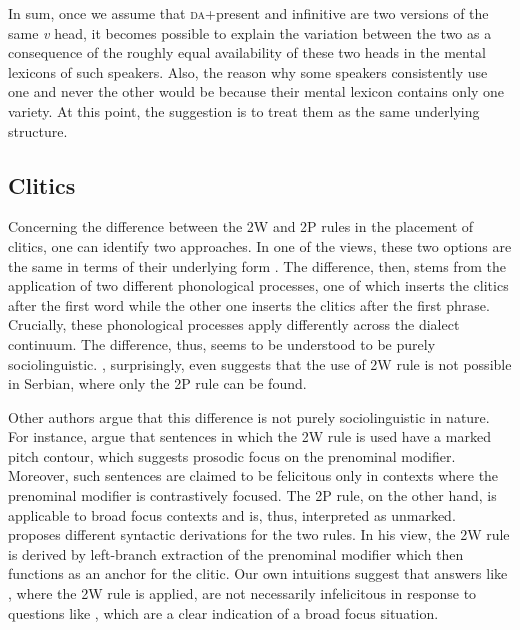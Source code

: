\documentclass[output=paper,modfonts,newtxmath,hidelinks,]{langscibook}
\begin{document}
\noindent In sum, once we assume that \textsc{da}+present and infinitive are two versions of the same \textit{v} head, it becomes possible to explain the variation between the two as a consequence of the roughly equal availability of these two heads in the mental lexicons of such speakers. Also, the reason why some speakers consistently use one and never the other would be because their mental lexicon contains only one variety. At this point, the suggestion is to treat them as the same underlying structure.

\subsection{Clitics}\label{7:s4.2}

Concerning the difference between the 2W and 2P rules in the placement of cli\-tics, one can identify two approaches. In one of the views, these two options are the same in terms of their underlying form \citep{Ronelle2006,Ronelle2008,Yu2008}. The difference, then, stems from the application of two different phonological processes, one of which inserts the clitics after the first word while the other one inserts the clitics after the first phrase. Crucially, these phonological processes apply differently across the dialect continuum. The difference, thus, seems to be understood to be purely sociolinguistic. \citet{Anderson2005}, surprisingly, even suggests that the use of 2W rule is not possible in Serbian, where only the 2P rule can be found.

Other authors argue that this difference is not purely sociolinguistic in nature. For instance, \citet{DiesingEtAl2009} argue that sentences in which the 2W rule is used have a marked pitch contour, which suggests prosodic focus on the prenominal modifier. Moreover, such sentences are claimed to be felicitous only in contexts where the prenominal modifier is contrastively focused. The 2P rule, on the other hand, is applicable to broad focus contexts and is, thus, interpreted as unmarked. \citet{Boskovic2009} proposes different syntactic derivations for the two rules. In his view, the 2W rule is derived by left-branch extraction of the prenominal modifier which then functions as an anchor for the clitic. Our own intuitions suggest that answers like , where the 2W rule is applied, are not necessarily infelicitous in response to questions like , which are a clear indication of a broad focus situation.

\ea \label{7:ex18}
	\z
\z
\end{document}

